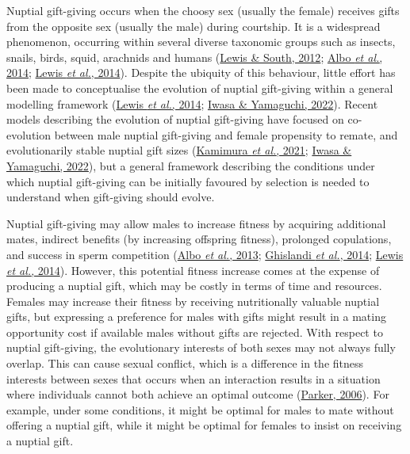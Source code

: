 \documentclass[
]{article}
\begin{document}
Nuptial gift-giving occurs when the choosy sex (usually the female)
receives gifts from the opposite sex (usually the male) during
courtship. It is a widespread phenomenon, occurring within several
diverse taxonomic groups such as insects, snails, birds, squid,
arachnids and humans (\protect\hyperlink{ref-Lewis2012}{Lewis \& South,
2012}; \protect\hyperlink{ref-Albo2014}{Albo \emph{et al.}, 2014};
\protect\hyperlink{ref-Lewis2014}{Lewis \emph{et al.}, 2014}). Despite
the ubiquity of this behaviour, little effort has been made to
conceptualise the evolution of nuptial gift-giving within a general
modelling framework (\protect\hyperlink{ref-Lewis2014}{Lewis \emph{et
al.}, 2014}; \protect\hyperlink{ref-Iwasa2022}{Iwasa \& Yamaguchi,
2022}). Recent models describing the evolution of nuptial gift-giving
have focused on co-evolution between male nuptial gift-giving and female
propensity to remate, and evolutionarily stable nuptial gift sizes
(\protect\hyperlink{ref-Kamimura2021}{Kamimura \emph{et al.}, 2021};
\protect\hyperlink{ref-Iwasa2022}{Iwasa \& Yamaguchi, 2022}), but a
general framework describing the conditions under which nuptial
gift-giving can be initially favoured by selection is needed to
understand when gift-giving should evolve.

Nuptial gift-giving may allow males to increase fitness by acquiring
additional mates, indirect benefits (by increasing offspring fitness),
prolonged copulations, and success in sperm competition
(\protect\hyperlink{ref-Albo2013}{Albo \emph{et al.}, 2013};
\protect\hyperlink{ref-Ghislandi2014}{Ghislandi \emph{et al.}, 2014};
\protect\hyperlink{ref-Lewis2014}{Lewis \emph{et al.}, 2014}). However,
this potential fitness increase comes at the expense of producing a
nuptial gift, which may be costly in terms of time and resources.
Females may increase their fitness by receiving nutritionally valuable
nuptial gifts, but expressing a preference for males with gifts might
result in a mating opportunity cost if available males without gifts are
rejected. With respect to nuptial gift-giving, the evolutionary
interests of both sexes may not always fully overlap. This can cause
sexual conflict, which is a difference in the fitness interests between
sexes that occurs when an interaction results in a situation where
individuals cannot both achieve an optimal outcome
(\protect\hyperlink{ref-Parker2006}{Parker, 2006}). For example, under
some conditions, it might be optimal for males to mate without offering
a nuptial gift, while it might be optimal for females to insist on
receiving a nuptial gift.
\end{document}
